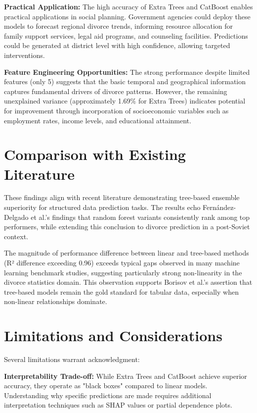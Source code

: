 \textbf{Practical Application:} The high accuracy of Extra Trees and CatBoost enables practical applications in social planning. Government agencies could deploy these models to forecast regional divorce trends, informing resource allocation for family support services, legal aid programs, and counseling facilities. Predictions could be generated at district level with high confidence, allowing targeted interventions.

\textbf{Feature Engineering Opportunities:} The strong performance despite limited features (only 5) suggests that the basic temporal and geographical information captures fundamental drivers of divorce patterns. However, the remaining unexplained variance (approximately 1.69\% for Extra Trees) indicates potential for improvement through incorporation of socioeconomic variables such as employment rates, income levels, and educational attainment.

\section{Comparison with Existing Literature}

These findings align with recent literature demonstrating tree-based ensemble superiority for structured data prediction tasks. The results echo Fernández-Delgado et al.'s findings that random forest variants consistently rank among top performers, while extending this conclusion to divorce prediction in a post-Soviet context.

The magnitude of performance difference between linear and tree-based methods (R² difference exceeding 0.96) exceeds typical gaps observed in many machine learning benchmark studies, suggesting particularly strong non-linearity in the divorce statistics domain. This observation supports Borisov et al.'s assertion that tree-based models remain the gold standard for tabular data, especially when non-linear relationships dominate.

\section{Limitations and Considerations}

Several limitations warrant acknowledgment:

\textbf{Interpretability Trade-off:} While Extra Trees and CatBoost achieve superior accuracy, they operate as "black boxes" compared to linear models. Understanding why specific predictions are made requires additional interpretation techniques such as SHAP values or partial dependence plots.

